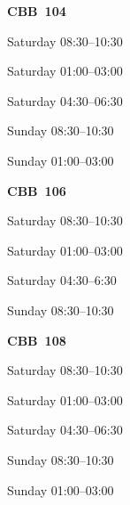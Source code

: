 \documentclass[11pt,oneside,letter]{article}
\begin{document}
\begin{center}
{\LARGE {\bf CBB~104}}
\end{center}

\begin{center}
{\large Saturday 08:30--10:30}
\end{center}

\begin{center}
{\large Saturday 01:00--03:00}
\end{center}

\begin{center}
{\large Saturday 04:30--06:30}
\end{center}

\begin{center}
{\large Sunday 08:30--10:30}
\end{center}

\begin{center}
{\large Sunday 01:00--03:00}
\end{center}


\newpage
\begin{center}
{\LARGE {\bf CBB~106}}
\end{center}

\begin{center}
{\large Saturday 08:30--10:30}
\end{center}


\begin{center}
{\large Saturday 01:00--03:00}
\end{center}

\begin{center}
{\large Saturday 04:30--6:30}
\end{center}

\begin{center}
{\large Sunday 08:30--10:30}
\end{center}



\newpage


\begin{center}
{\LARGE {\bf CBB~108}}
\end{center}

\begin{center}
{\large Saturday 08:30--10:30}
\end{center}


\begin{center}
{\large Saturday 01:00--03:00}
\end{center}

\begin{center}
{\large Saturday 04:30--06:30}
\end{center}

\begin{center}
{\large Sunday 08:30--10:30}
\end{center}

\begin{center}
{\large Sunday 01:00--03:00}
\end{center}

\end{document}
